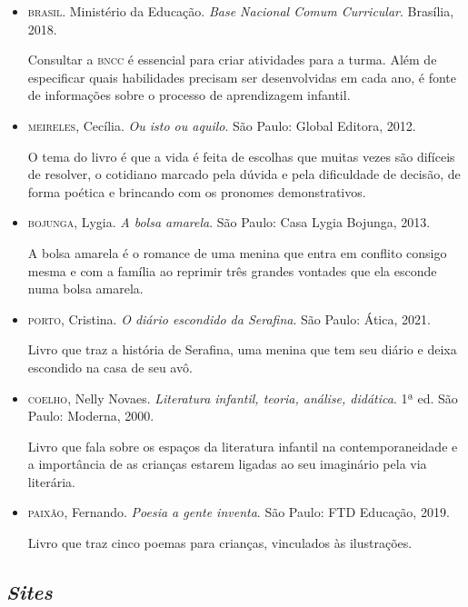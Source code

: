 \documentclass[11pt]{extarticle}
\begin{document}
\begin{itemize}
\item \textsc{brasil}. Ministério da Educação. \textit{Base Nacional Comum Curricular}. Brasília, 2018.

Consultar a \textsc{bncc} é essencial para criar atividades para a turma. Além de especificar quais habilidades precisam ser desenvolvidas em cada ano, é fonte de informações sobre o processo de aprendizagem infantil. 

\item \textsc{meireles}, Cecília. \textit{Ou isto ou aquilo}. São Paulo: Global Editora, 2012.

O tema do livro é que a vida é feita de escolhas que muitas vezes são difíceis de resolver, o cotidiano marcado pela dúvida e pela dificuldade de decisão, de forma poética e brincando com os pronomes demonstrativos.

\item \textsc{bojunga}, Lygia. \textit{A bolsa amarela}. São Paulo: Casa Lygia Bojunga, 2013.

A bolsa amarela é o romance de uma menina que entra em conflito consigo mesma e com a família ao reprimir três grandes vontades que ela esconde numa bolsa amarela.

\item \textsc{porto}, Cristina. \textit{O diário escondido da Serafina}. São Paulo: Ática, 2021.

Livro que traz a história de Serafina, uma menina que tem seu diário e deixa escondido na casa de seu avô.

\item \textsc{coelho}, Nelly Novaes. \textit{Literatura infantil, teoria, análise, didática}. 1ª ed. São Paulo: Moderna, 2000.

Livro que fala sobre os espaços da literatura infantil na contemporaneidade e a importância de as crianças estarem ligadas ao seu imaginário pela via literária.

\item \textsc{paixão}, Fernando. \textit{Poesia a gente inventa}. São Paulo: FTD Educação, 2019.

Livro que traz cinco poemas para crianças, vinculados às ilustrações.

\end{itemize}

\subsection{\textit{Sites}}
\end{document}
